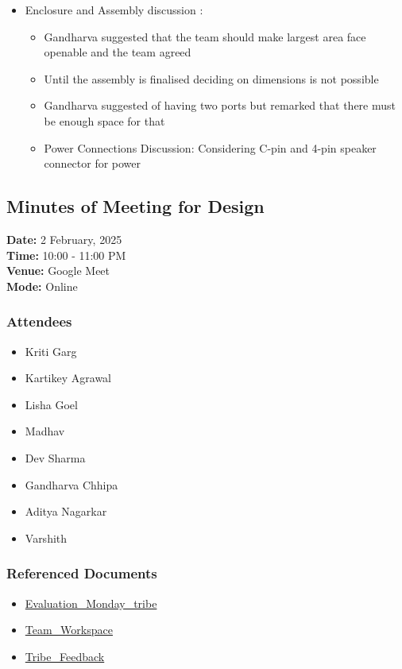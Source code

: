 \documentclass[12pt,a4paper]{article}
\begin{document}
\begin{itemize}
\begin{itemize}
    \end{itemize}
    \item Enclosure and Assembly discussion :
    \begin{itemize}
        \item Gandharva suggested that the team should make largest area face openable and the team agreed
        \item Until the assembly is finalised deciding on dimensions is not possible
        \item Gandharva suggested of having two ports but remarked that there must be enough space for that
        \item Power Connections Discussion: Considering C-pin and 4-pin speaker connector for power
    \end{itemize}
\end{itemize}

\subsection*{Minutes of Meeting for Design}
\noindent
\textbf{Date:} 2 February, 2025 \\
\textbf{Time:} 10:00 - 11:00 PM \\
\textbf{Venue:} Google Meet \\
\textbf{Mode:} Online \\

\subsubsection*{Attendees}
\begin{itemize}
    \item Kriti Garg
    \item Kartikey Agrawal
    \item Lisha Goel
    \item Madhav
    \item Dev Sharma
    \item Gandharva Chhipa
    \item Aditya Nagarkar
    \item Varshith
\end{itemize}

\subsubsection*{Referenced Documents}
\begin{itemize}
    \item \href{https://docs.google.com/spreadsheets/u/0/d/1mf3VolONgFL6qE_bgLDeh4sSy1PNTC3in6jEBaED-h8/edit}{Evaluation\_Monday\_tribe}
    \item \href{https://docs.google.com/spreadsheets/u/0/d/1uf0n1ec6wdD89DGu6o5pDTRil8vPTHQxd6ou25UlpaI/edit}{Team\_Workspace}
    \item \href{https://docs.google.com/document/u/0/d/1IVD8nQkdYI0tBmnchBCmUj0YVEVN_2yDqmUBOeMQ9xg/edit}{Tribe\_Feedback}
\end{itemize}
\end{document}
